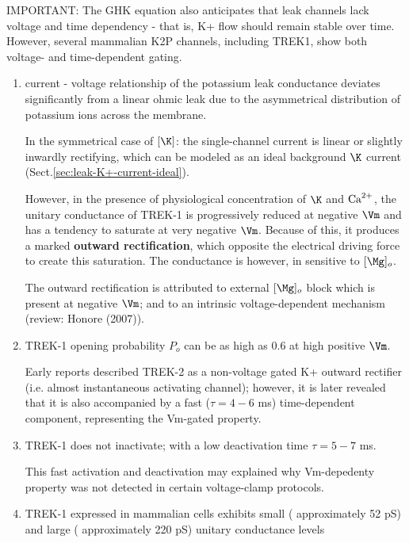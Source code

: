 IMPORTANT: The GHK equation also anticipates that leak channels lack voltage
and time dependency - that is, K+ flow should remain stable over time. However,
several mammalian K2P channels, including TREK1, show both voltage- and
time-dependent gating.


\begin{enumerate}
	
    \item current - voltage relationship of the potassium leak conductance
   deviates significantly from a linear ohmic leak due to the asymmetrical
   distribution of potassium ions across the membrane.

	In the symmetrical case of $[\K]$: the single-channel current 
	is linear or slightly inwardly rectifying, which can be modeled as an ideal
	background $\K$ current (Sect.\ref{sec:leak-K+-current-ideal}).
	
	However, in the presence of physiological concentration of $\K$ and ${\text{Ca}^{2+}}$, the
	unitary conductance of TREK-1 is progressively reduced at negative $\Vm$ and
	has a tendency to saturate at very negative $\Vm$. Because of this, it produces
	a marked {\bf outward rectification}, which opposite the electrical driving
	force to create this saturation. The conductance is however, in sensitive to
	$[\Mg]_o$.
	
	The outward rectification is attributed to external $[\Mg]_o$ block which is
	present at negative $\Vm$; and to an intrinsic voltage-dependent mechanism
	(review: Honore (2007)).
	
	\item TREK-1 opening probability $P_o$ can be as high as 0.6  at high positive
	$\Vm$.

Early reports described TREK-2 as a non-voltage gated K+ outward rectifier (i.e.
almost instantaneous activating channel); however, it is later revealed that it
is also accompanied by a fast ($\tau = 4 - 6$ ms) time-dependent component,
representing the Vm-gated property. 

   \item TREK-1 does not inactivate; with a low deactivation time $\tau = 5 - 7$
   ms. 

This fast activation and deactivation may explained why Vm-depedenty property
was not detected in certain voltage-clamp protocols.

  \item TREK-1 expressed in mammalian cells exhibits small ( approximately 52
  pS) and large ( approximately 220 pS) unitary conductance levels
  

\end{enumerate}
